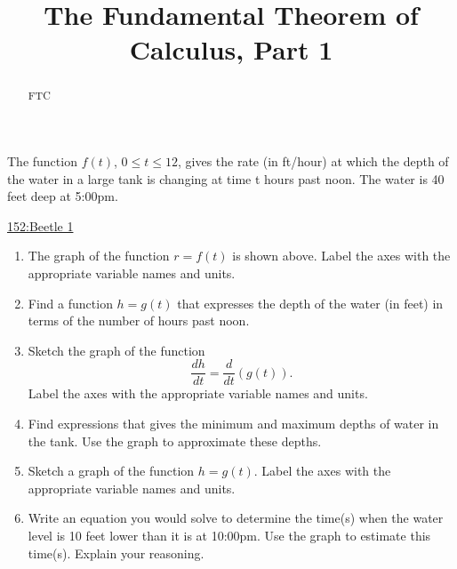 \documentclass{ximera}
\title{The Fundamental Theorem of Calculus, Part 1}
\begin{document}
\begin{abstract}
FTC
\end{abstract}
\maketitle


\begin{question}\label{Q7yyweff}
The function $f(t)$, $0 \leq t \leq 12$, gives the rate (in ft/hour) at which the
depth of the water in a large tank is changing at time t hours past noon.
The water is 40 feet deep at 5:00pm.


\begin{onlineOnly}
    \begin{center}
\end{center}
\end{onlineOnly}

\href{https://www.desmos.com/calculator/gnwlraiqhd}{152:Beetle 1}



\begin{enumerate}
    \item The graph of the function $r=f(t)$ is shown above. Label the axes with
the appropriate variable names and units.

\item Find a function $h = g(t)$ that expresses the depth of the water (in feet) in terms of the number of hours past noon.

\item Sketch the graph of the function 
\[
   \frac{dh}{dt} = \frac{d}{dt}\left( g(t)\right).
\]
Label the axes with the appropriate variable names and units.

\item Find expressions that gives the minimum and maximum depths of water
in the tank. Use the graph to approximate these depths.

\item Sketch a graph of the function $h=g(t)$. Label the axes with the appropriate variable names and units.

\item Write an equation you would solve to determine the time(s) when the
water level is 10 feet lower than it is at 10:00pm. Use the graph to estimate
this time(s). Explain your reasoning.
\end{enumerate}


\end{question}
\end{document}
